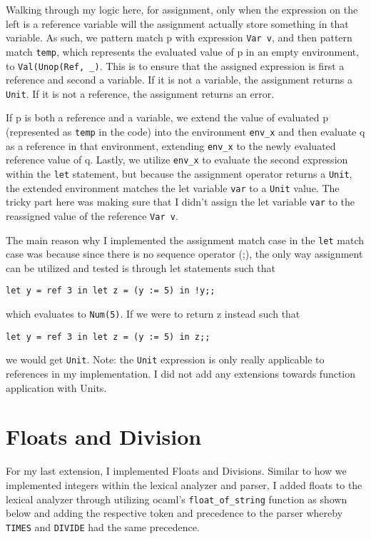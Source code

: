\documentclass{article}
\def\code#1{\texttt{#1}}
\begin{document}
Walking through my logic here, for assignment, only when the expression on the left is a reference variable will the assignment actually store something in that variable. As such, we pattern match p with expression \code{Var v}, and then pattern match \code{temp}, which represents the evaluated value of p in an empty environment, to \code{Val(Unop(Ref, \_)}. This is to ensure that the assigned expression is first a reference and second a variable. If it is not a variable, the assignment returns a \code{Unit}. If it is not a reference, the assignment returns an error. 

If p is both a reference and a variable, we extend the value of evaluated p (represented as \code{temp} in the code) into the environment \code{env\_x} and then evaluate q as a reference in that environment, extending \code{env\_x} to the newly evaluated reference value of q. Lastly, we utilize \code{env\_x} to evaluate the second expression within the \code{let} statement, but because the assignment operator returns a \code{Unit}, the extended environment matches the let variable \code{var} to a \code{Unit} value. The tricky part here was making sure that I didn't assign the let variable \code{var} to the reassigned value of the reference \code{Var v}. 

The main reason why I implemented the assignment match case in the \code{let} match case was because since there is no sequence operator (;), the only way assignment can be utilized and tested is through let statements such that 

\begin{verbatim}
let y = ref 3 in let z = (y := 5) in !y;;
\end{verbatim}

which evaluates to \code{Num(5)}. If we were to return z instead such that 

\begin{verbatim}
let y = ref 3 in let z = (y := 5) in z;;
\end{verbatim}

we would get \code{Unit}. 
Note: the \code{Unit} expression is only really applicable to references in my implementation. I did not add any extensions towards function application with Units.

\section{Floats and Division}
For my last extension, I implemented Floats and Divisions. Similar to how we implemented integers within the lexical analyzer and parser, I added floats to the lexical analyzer through utilizing ocaml's \code{float\_of\_string} function as shown below and adding the respective token and precedence to the parser whereby \code{TIMES} and \code{DIVIDE} had the same precedence.
\end{document}
